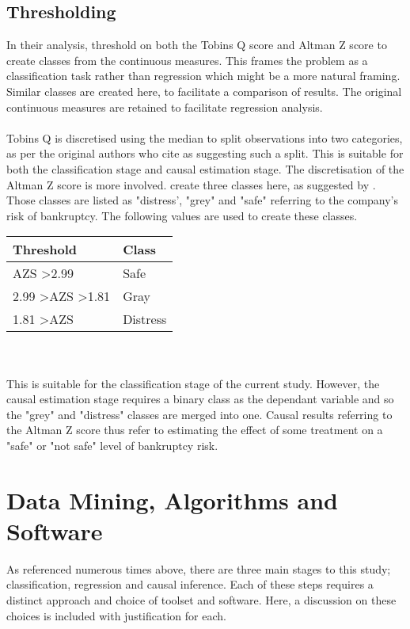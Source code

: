 {\subsection{Thresholding}
{In their analysis, \cite{moldovan2015learning} threshold on both the Tobins Q score and Altman Z score to create classes from the continuous measures. This frames the problem as a classification task rather than regression which might be a more natural framing. Similar classes are created here, to facilitate a comparison of results. The original continuous measures are retained to facilitate regression analysis.  \\\\
Tobins Q is discretised using the median to split observations into two categories, as per the original authors who cite \cite{creamer2010learning} as suggesting such a split. This is suitable for both the classification stage and causal estimation stage. The discretisation of the Altman Z score is more involved. \cite{moldovan2015learning} create three classes here, as suggested by \cite{altman1968financial}. Those classes are listed as "distress', "grey" and "safe" referring to the company's risk of bankruptcy. The following values are used to create these classes. \\
\begin{tabular}{ |p{4cm}|p{3cm}|  }
 \hline
 Threshold & Class \\
 \hline
 AZS \textgreater 2.99 & Safe  \\
 2.99 \textgreater AZS \textgreater 1.81 &   Gray  \\
 1.81 \textgreater AZS  & Distress   \\
 \hline
\end{tabular}\\\\
This is suitable for the classification stage of the current study. However, the causal estimation stage requires a binary class as the dependant variable and so the "grey" and "distress" classes are merged into one. Causal results referring to the Altman Z score thus refer to estimating the effect of some treatment on a "safe" or "not safe" level of bankruptcy risk.} 
\section{Data Mining, Algorithms and Software}
{As referenced numerous times above, there are three main stages to this study; classification, regression and causal inference. Each of these steps requires a distinct approach and choice of toolset and software. Here, a discussion on these choices is included with justification for each.}
}
